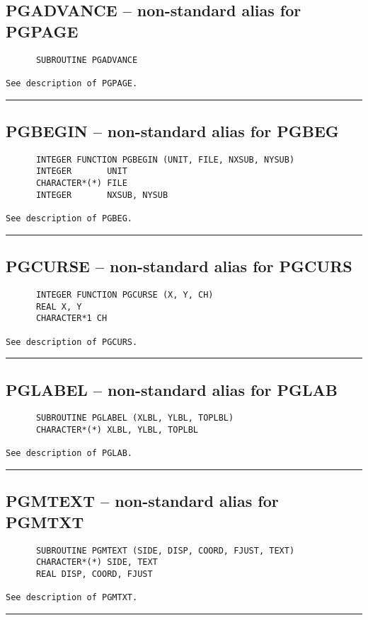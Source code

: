 {\subsection*{PGADVANCE -- non-standard alias for PGPAGE }
\begin{verbatim}
      SUBROUTINE PGADVANCE

See description of PGPAGE.
\end{verbatim}
\hrule


\subsection*{PGBEGIN -- non-standard alias for PGBEG }
\begin{verbatim}
      INTEGER FUNCTION PGBEGIN (UNIT, FILE, NXSUB, NYSUB)
      INTEGER       UNIT
      CHARACTER*(*) FILE
      INTEGER       NXSUB, NYSUB

See description of PGBEG.   
\end{verbatim}
\hrule


\subsection*{PGCURSE -- non-standard alias for PGCURS }
\begin{verbatim}
      INTEGER FUNCTION PGCURSE (X, Y, CH)
      REAL X, Y
      CHARACTER*1 CH

See description of PGCURS.
\end{verbatim}
\hrule


\subsection*{PGLABEL -- non-standard alias for PGLAB }
\begin{verbatim}
      SUBROUTINE PGLABEL (XLBL, YLBL, TOPLBL)
      CHARACTER*(*) XLBL, YLBL, TOPLBL

See description of PGLAB.
\end{verbatim}
\hrule


\subsection*{PGMTEXT -- non-standard alias for PGMTXT }
\begin{verbatim}
      SUBROUTINE PGMTEXT (SIDE, DISP, COORD, FJUST, TEXT)
      CHARACTER*(*) SIDE, TEXT
      REAL DISP, COORD, FJUST

See description of PGMTXT.
\end{verbatim}
\hrule


}
